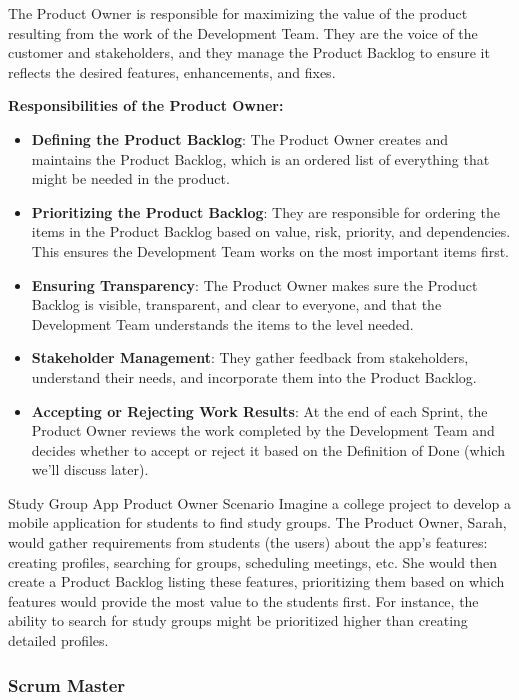 The Product Owner is responsible for maximizing the value of the product
resulting from the work of the Development Team. They are the voice of the
customer and stakeholders, and they manage the Product Backlog to ensure it
reflects the desired features, enhancements, and fixes.

\textbf{Responsibilities of the Product Owner:}

\begin{itemize}
  \item \textbf{Defining the Product Backlog}: The Product Owner creates and maintains the Product Backlog, which is an ordered list of everything that might be needed in the product.
  \item \textbf{Prioritizing the Product Backlog}: They are responsible for ordering the items in the Product Backlog based on value, risk, priority, and dependencies. This ensures the Development Team works on the most important items first.
  \item \textbf{Ensuring Transparency}: The Product Owner makes sure the Product Backlog is visible, transparent, and clear to everyone, and that the Development Team understands the items to the level needed.
  \item \textbf{Stakeholder Management}: They gather feedback from stakeholders, understand their needs, and incorporate them into the Product Backlog.
  \item \textbf{Accepting or Rejecting Work Results}: At the end of each Sprint, the Product Owner reviews the work completed by the Development Team and decides whether to accept or reject it based on the Definition of Done (which we'll discuss later).
\end{itemize}

\begin{examplecard}{Study Group App Product Owner Scenario}
  Imagine a college project to develop a mobile application for students to find study groups. The Product Owner, Sarah, would gather requirements from students (the users) about the app's features: creating profiles, searching for groups, scheduling meetings, etc. She would then create a Product Backlog listing these features, prioritizing them based on which features would provide the most value to the students first. For instance, the ability to search for study groups might be prioritized higher than creating detailed profiles.
\end{examplecard}

\subsubsection{Scrum Master}

